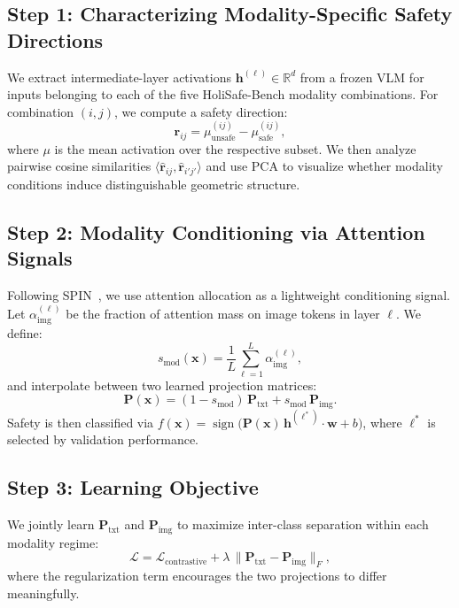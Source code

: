 \documentclass{article}
\begin{document}
\subsection{Step 1: Characterizing Modality-Specific Safety Directions}
We extract intermediate-layer activations $\mathbf{h}^{(\ell)}\in\mathbb{R}^d$ from a frozen VLM
for inputs belonging to each of the five HoliSafe-Bench modality combinations. For combination
$(i,j)$, we compute a safety direction:
\begin{equation}
  \mathbf{r}_{ij} = \mu_\text{unsafe}^{(ij)} - \mu_\text{safe}^{(ij)},
\end{equation}
where $\mu$ is the mean activation over the respective subset. We then analyze pairwise cosine
similarities $\langle\hat{\mathbf{r}}_{ij},\hat{\mathbf{r}}_{i'j'}\rangle$ and use PCA to
visualize whether modality conditions induce distinguishable geometric structure.

\subsection{Step 2: Modality Conditioning via Attention Signals}
Following SPIN~\cite{chen2025spin}, we use attention allocation as a lightweight conditioning
signal. Let $\alpha_\text{img}^{(\ell)}$ be the fraction of attention mass on image tokens in
layer $\ell$. We define:
\begin{equation}
  s_\text{mod}(\mathbf{x}) = \frac{1}{L}\sum_{\ell=1}^{L}\alpha_\text{img}^{(\ell)},
\end{equation}
and interpolate between two learned projection matrices:
\begin{equation}
  \mathbf{P}(\mathbf{x}) = (1-s_\text{mod})\,\mathbf{P}_\text{txt}
                          + s_\text{mod}\,\mathbf{P}_\text{img}.
\end{equation}
Safety is then classified via
$f(\mathbf{x}) = \operatorname{sign}\!\bigl(\mathbf{P}(\mathbf{x})\,\mathbf{h}^{(\ell^*)}\cdot\mathbf{w}+b\bigr)$,
where $\ell^*$ is selected by validation performance.

\subsection{Step 3: Learning Objective}
We jointly learn $\mathbf{P}_\text{txt}$ and $\mathbf{P}_\text{img}$ to maximize inter-class
separation within each modality regime:
\begin{equation}
  \mathcal{L} = \mathcal{L}_\text{contrastive}
              + \lambda\,\|\mathbf{P}_\text{txt}-\mathbf{P}_\text{img}\|_F,
\end{equation}
where the regularization term encourages the two projections to differ meaningfully.
\end{document}
